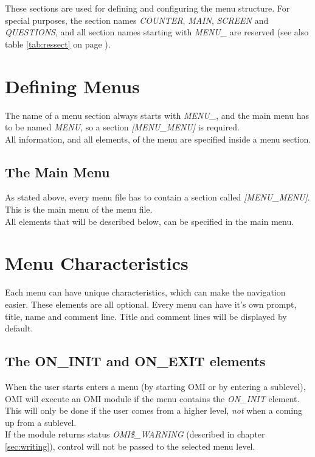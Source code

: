 \documentclass[a4paper]{book}
\newcommand{\vs}{\vspace{3mm}}
\begin{document}
\vs

These sections are used for defining and configuring the menu structure. For 
special purposes, the section names \textsl{COUNTER}, \textsl{MAIN}, \textsl{SCREEN} and 
\textsl{QUESTIONS}, and all section names starting with \textsl{MENU{\_}} are reserved 
(see also table \ref{tab:ressect} on page \pageref{tab:ressect}).

\section{Defining Menus}
\label{subsec:defining}

The name of a menu section always starts with \textsl{MENU{\_}}, and the main menu 
has to be named \textsl{MENU}, so a section \textsl{[MENU{\_}MENU]} is required. \\
All information, and all elements, of the menu are specified inside a menu 
section.

\subsection{The Main Menu}
\label{subsubsec:mylabel21}

As stated above, every menu file has to contain a section called 
\textsl{[MENU{\_}MENU]}. This is the main menu of the menu file. \\
All elements that will be described below, can be specified in the main 
menu.

\section{Menu Characteristics}
\label{subsec:mylabel3}

Each menu can have unique characteristics, which can make the navigation 
easier. These elements are all optional. Every menu can have it's own 
prompt, title, name and comment line. Title and comment lines will be 
displayed by default.

\subsection{The ON{\_}INIT and ON{\_}EXIT elements}
\label{subsubsec:mylabel22}

When the user starts enters a menu (by starting OMI or by entering a 
sublevel), OMI will execute an OMI module if the menu contains the 
\textsl{ON{\_}INIT} element. This will only be done 
if the user comes from a higher level, \textit{not} when a coming up from a sublevel. \\
If the module returns status \textsl{OMI{\$}{\_}WARNING} (described in chapter \ref{sec:writing}), 
control will not be passed to the selected menu level.
\end{document}

